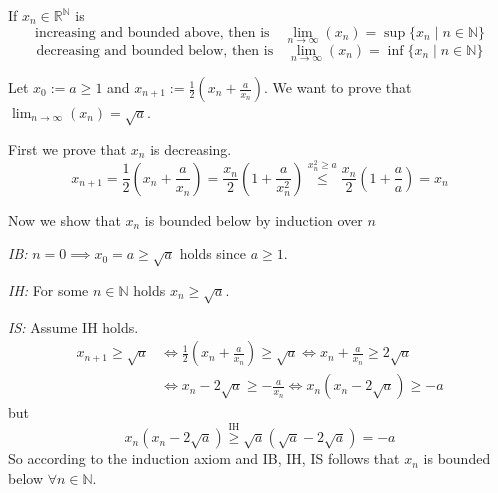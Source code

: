 \begin{theorem}\label{thm:incr_bound_conv}
   If \(x_n \in \mathbb{R}^\mathbb{N}\) is
   \[\text{increasing and bounded above, then is} \quad \lim_{n \to \infty}(x_n) = \sup\{x_n \mid n \in \mathbb{N}\}\]
   \[\text{decreasing and bounded below, then is} \quad \lim_{n \to \infty}(x_n) = \inf\{x_n \mid n \in \mathbb{N}\}\]
\end{theorem}
\begin{example}
   Let \(x_0 := a \geq 1\) and \(x_{n+1} := \frac{1}{2} \left(x_n + \frac{a}{x_n}\right)\).
   We want to prove that \(\lim_{n \to \infty}(x_n) = \sqrt{a}\).

   First we prove that \(x_n\) is decreasing.
   \[x_{n+1} = \frac{1}{2} \left(x_n + \frac{a}{x_n}\right) = \frac{x_n}{2} \left(1 + \frac{a}{x_n^2}\right) \overset{x_n^2 \geq a}{\leq} \frac{x_n}{2} \left(1 + \frac{a}{a}\right) = x_n\]

   Now we show that \(x_n\) is bounded below by induction over \(n\)

   \emph{IB:} \(n = 0 \implies x_0 = a \geq \sqrt{a}\) holds since \(a \geq 1\).

   \emph{IH:} For some \(n \in \mathbb{N}\) holds \(x_n \geq \sqrt{a}\).

   \emph{IS:} Assume IH holds.
   \begin{equation*}
      \begin{split}
         x_{n+1} \geq \sqrt{a} & \iff \frac{1}{2} \left(x_n + \frac{a}{x_n}\right) \geq \sqrt{a} \iff x_n + \frac{a}{x_n} \geq 2 \sqrt{a}\\
                               & \iff x_n - 2\sqrt{a} \geq - \frac{a}{x_n} \iff x_n(x_n - 2\sqrt{a}) \geq -a
      \end{split}
   \end{equation*}
   but
   \[x_n(x_n - 2 \sqrt{a}) \overset{\text{IH}}{\geq} \sqrt{a}(\sqrt{a} - 2 \sqrt{a}) = -a\]
   So according to the induction axiom and IB, IH, IS follows that \(x_n\) is bounded below \(\forall n \in \mathbb{N}\).
\end{example}

